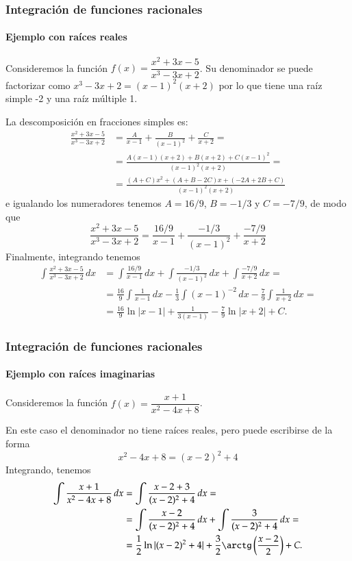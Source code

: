 \begin{frame}[allowframebreaks]
\frametitle{Integración de funciones racionales}
\framesubtitle{Ejemplo con raíces reales}
Consideremos la función $f(x)=\dfrac{x^2+3x-5}{x^3-3x+2}$. Su denominador se puede factorizar como $x^3-3x+2=(x-1)^2(x+2)$ por lo que tiene una raíz simple -2 y una raíz múltiple 1.

La descomposición en fracciones simples es:
\begin{align*}
\frac{x^2+3x-5}{x^3-3x+2}&=\frac{A}{x-1}+\frac{B}{(x-1)^2}+\frac{C}{x+2} = \\ &= \frac{A(x-1)(x+2)+ B(x+2)+C(x-1)^2}{(x-1)^2(x+2)} = \\ &= \frac{(A+C)x^2+(A+B-2C)x+(-2A+2B+C)}{(x-1)^2(x+2)}
\end{align*}
e igualando los numeradores tenemos $A=16/9$, $B=-1/3$ y $C=-7/9$, de modo que
\[
\frac{x^2+3x-5}{x^3-3x+2}= \frac{16/9}{x-1}+\frac{-1/3}{(x-1)^2}+\frac{-7/9}{x+2}
\]
Finalmente, integrando tenemos
\begin{align*}
\int \frac{x^2+3x-5}{x^3-3x+2}\, dx &= \int \frac{16/9}{x-1}\,dx+\int \frac{-1/3}{(x-1)^2}\,dx+\int \frac{-7/9}{x+2}\,dx = \\ &=
\frac{16}{9}\int\frac{1}{x-1}\,dx-\frac{1}{3}\int(x-1)^{-2}\,dx- \frac{7}{9}\int \frac{1}{x+2}\,dx = \\
&= \frac{16}{9}\ln|x-1|+\frac{1}{3(x-1)}-\frac{7}{9}\ln|x+2|+C.
\end{align*}
\end{frame}


\begin{frame}
\frametitle{Integración de funciones racionales}
\framesubtitle{Ejemplo con raíces imaginarias}
Consideremos la función $f(x)=\dfrac{x+1}{x^2-4x+8}$. 

En este caso el denominador no tiene raíces reales, pero puede escribirse de la forma
\[
x^2-4x+8 = (x-2)^2+4
\]
Integrando, tenemos
\begin{align*}
\int \dfrac{x+1}{x^2-4x+8}\, dx &= \int \dfrac{x-2+3}{(x-2)^2+4}\,dx = \\
&= \int \dfrac{x-2}{(x-2)^2+4}\,dx + \int \dfrac{3}{(x-2)^2+4}\,dx = \\
&= \frac{1}{2}\ln|(x-2)^2+4| + \dfrac{3}{2}\arctg\left(\frac{x-2}{2}\right)+C.
\end{align*}
\end{frame}


